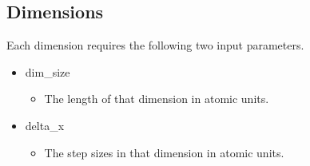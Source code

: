 \documentclass{article}
\begin{document}
\subsection{Dimensions} %
\label{sub:dimensions}
Each dimension requires the following two input parameters.
\begin{itemize}
	\item dim\_size
	\begin{itemize}
		\item The length of that dimension in atomic units.
	\end{itemize}
	\item delta\_x
	\begin{itemize}
		\item The step sizes in that dimension in atomic units.
	\end{itemize}
\end{itemize}
\end{document}
